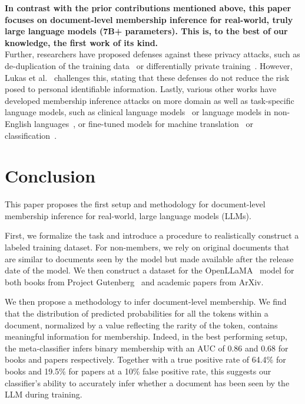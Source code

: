 \documentclass[twocolumn,10pt]{article}
\begin{document}
\textbf{In contrast with the prior contributions mentioned above, this paper focuses on document-level membership inference for real-world, truly large language models (7B+ parameters). This is, to the best of our knowledge, the first work of its kind.} \\


Further, researchers have proposed defenses against these privacy attacks, such as de-duplication of the training data~\cite{kandpal2022deduplicating} or differentially private training~\cite{li2021large}. However, Lukas et al.~\cite{lukas2023analyzing} challenges this, stating that these defenses do not reduce the risk posed to personal identifiable information.
Lastly, various other works have developed membership inference attacks on more domain as well as task-specific language models, such as clinical language models~\cite{jagannatha2021membership} or language models in non-English languages~\cite{oh2023membership}, or fine-tuned models for machine translation~\cite{hisamoto2020membership} or classification~\cite{shejwalkar2021membership,shachor2023improved}.

 \label{sec:related_work}


\section{Conclusion}

This paper proposes the first setup and methodology for document-level membership inference for real-world, large language models (LLMs). 

First, we formalize the task and introduce a procedure to realistically construct a labeled training dataset. For non-members, we rely on original documents that are similar to documents seen by the model but made available after the release date of the model. We then construct a dataset for the OpenLLaMA~\cite{openlm2023openllama} model for both books from Project Gutenberg~\cite{projectgutenberg} and academic papers from ArXiv.

We then propose a methodology to infer document-level membership. We find that the distribution of predicted probabilities for all the tokens within a document, normalized by a value reflecting the rarity of the token, contains meaningful information for membership. Indeed, in the best performing setup, the meta-classifier infers binary membership with an AUC of 0.86 and 0.68 for books and papers respectively. Together with a true positive rate of 64.4\% for books and 19.5\% for papers at a 10\% false positive rate, this suggests our classifier's ability to accurately infer whether a document has been seen by the LLM during training. 
 





\end{document}
